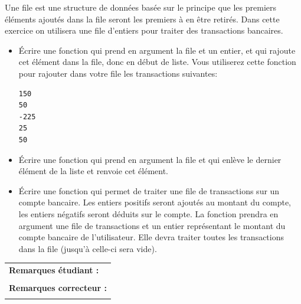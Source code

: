 \documentclass[a4paper,11pt]{article}
\begin{document}
Une file est une structure de données basée sur le principe que les premiers éléments ajoutés dans la file seront les premiers à en être retirés.
Dans cette exercice on utilisera une file d'entiers pour traiter des transactions bancaires. 
\begin{itemize}
\item[1.] Écrire une fonction qui prend en argument la file et un entier, et qui rajoute cet élément dans la file, donc en début de liste. 
Vous utiliserez cette fonction pour rajouter dans votre file les transactions suivantes: 
\begin{verbatim}
150
50
-225
25
50
\end{verbatim}
\item[2.]  Écrire une fonction qui prend en argument la file et qui enlève le dernier élément de la liste et renvoie cet élément. 
\item[3.]  Écrire une fonction qui permet de traiter une file de  transactions sur un compte bancaire. Les entiers positifs seront ajoutés au montant du compte, les entiers négatifs seront déduits sur le compte. 
La fonction prendra en argument une  file de transactions  et un entier représentant le montant du compte bancaire de l'utilisateur. Elle devra traiter toutes les transactions dans la file (jusqu'à celle-ci sera vide). 
\end{itemize}


\vspace*{-0.2 cm}
\begin{table}[h!]
\centering
\renewcommand{\arraystretch}{1.4} %
\begin{tabular}{|p{15cm}|}
\hline
\textbf{Remarques étudiant :}    \\
 \\
\hline
\textbf{Remarques correcteur :}  \\
 \\
\hline
\end{tabular}
\end{table}
\end{document}
